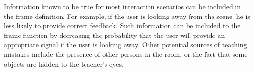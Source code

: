 Information known to be true for most interaction scenarios can be included in the frame definition. For example, if the user is looking away from the scene, he is less likely to provide correct feedback. Such information can be included to the frame function by decreasing the probability that the user will provide an appropriate signal if the user is looking away. Other potential sources of teaching mistakes include the presence of other persons in the room, or the fact that some objects are hidden to the teacher's eyes.





